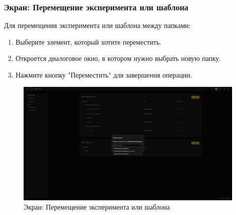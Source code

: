 \documentclass[a4paper,12pt,reqno]{article}
\begin{document}
\subsubsection{Экран: Перемещение эксперимента или шаблона}
Для перемещения эксперимента или шаблона между папками:
\begin{enumerate}
    \item Выберите элемент, который хотите переместить.
    \item Откроется диалоговое окно, в котором нужно выбрать новую папку.
    \item Нажмите кнопку "Переместить" для завершения операции.
\end{enumerate}
\begin{figure}[H]
    \centering
    \includegraphics[width=\textwidth]{RO/img/move_dialog.png} %
    \caption{Экран: Перемещение эксперимента или шаблона}
    \label{fig:move_dialog}
\end{figure}
\end{document}
